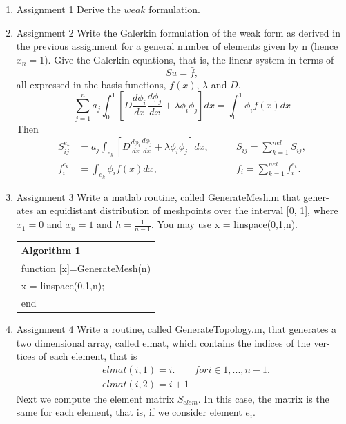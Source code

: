 \documentclass[a4paper,10pt]{report}
\begin{document}
\begin{enumerate}
 \item{Assignment 1} Derive the $weak$ formulation. \\
 
\item{Assignment 2} Write the Galerkin formulation of the weak form as derived
in the previous assignment for a general number of elements given by n (hence
$x_n = 1$). Give the Galerkin equations, that is, the linear system in terms of
\begin{equation}\label{eq:4}
S\bar{u} = \bar{f},
 \end{equation}
all expressed in the basis-functions, $f(x)$, $\lambda$ and $D$.\\

 \begin{equation}\label{eq:5}
\sum_{j=1}^na_j\int_{0}^{1}\left[D\frac{d\phi_i}{dx}\frac{d\phi_j}{dx}+\lambda \phi_i \phi_j \right]dx= \int_{0}^{1}\phi_i f(x)dx
\end{equation}
Then 
\begin{align*}
S_{ij}^{e_k}&=a_j\int_{e_k}\left[D\frac{d\phi_i}{dx}\frac{d\phi_j}{dx}+\lambda \phi_i \phi_j \right]dx, \qquad &S_{ij}=\sum_{k=1}^{nel}S_{ij},\\
f_i^{e_k}&=\int_{e_k}\phi_i f(x)dx, \qquad &f_i=\sum_{k=1}^{nel}f_i^{e_k}.
\end{align*}
\item{Assignment 3} Write a matlab routine, called GenerateMesh.m that gener-
ates an equidistant distribution of meshpoints over the interval [0, 1], where
$x_1 = 0$ and $x_n = 1$ and $h =\frac{1}{n−1}$. You may use x = linspace(0,1,n).

\begin{table}[!h]\centering

\begin{tabular}{ |l| } 
\hline
\textbf{Algorithm 1}\\
\hline
\hspace{0.5cm}function [x]=GenerateMesh(n)\\
\hspace{1cm}x = linspace(0,1,n);\\
\hspace{0.5cm}end\\
\hline
\end{tabular}
\end{table}

\item{Assignment 4} Write a routine, called GenerateTopology.m, that generates
a two dimensional array, called elmat, which contains the indices of the ver-
tices of each element, that is
\begin{align*}
&elmat(i, 1) = i. \qquad for i ∈ {1, . . . , n − 1}.\\
&elmat(i, 2) = i + 1
\end{align*}
Next we compute the element matrix $S_{elem}$. In this case, the matrix is the
same for each element, that is, if we consider element $e_i$.


\end{enumerate}
\end{document}
